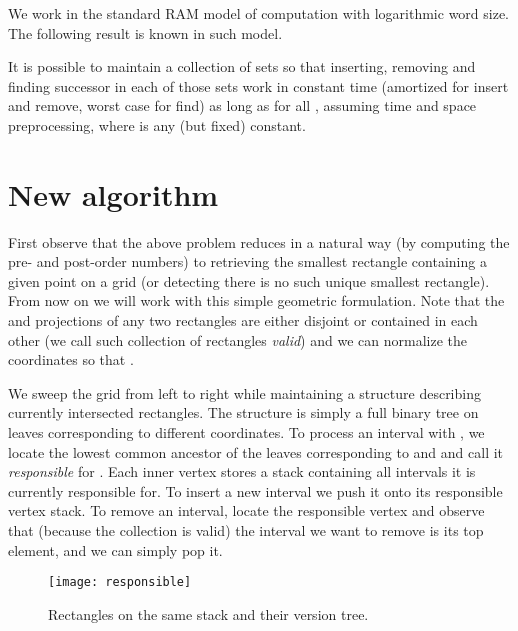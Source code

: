 \documentclass[runningheads]{llncs}
\begin{document}
We work in the standard RAM model of computation with logarithmic word size. The following result is known in such model.

\begin{lemma}\label{lemma:atomic}
It is possible to maintain a collection of sets  so that inserting, removing and finding successor in each of those sets work in constant time (amortized for insert and remove, worst case for find) as long as  for all , assuming  time and space preprocessing, where  is any (but fixed) constant.
\end{lemma} 

\section{New algorithm}
\label{section:algorithm}

First observe that the above problem reduces in a natural way (by computing the pre- and post-order numbers) to retrieving the smallest rectangle containing a given point on a  grid (or detecting there is no such unique smallest rectangle). From now on we will work with this simple geometric formulation. Note that the  and  projections of any two rectangles are either disjoint or contained in each other (we call such collection of rectangles {\it valid}) and we can normalize the coordinates so that .

We sweep the grid from left to right while maintaining a structure describing currently intersected rectangles. The structure is simply a full binary tree on  leaves corresponding to different  coordinates. To process an interval  with
, we locate the lowest common ancestor  of the leaves corresponding to  and  and call it {\it responsible} for . Each inner vertex stores a stack containing all intervals it is currently responsible for. To insert a new interval we push it onto its responsible vertex stack. To remove an interval, locate the responsible vertex and observe that (because the collection is valid) the interval we want to remove is its top element, and we can simply pop it.

\begin{figure}[t]
\centering
\texttt{[image: responsible]}
\caption{Rectangles on the same stack and their version tree.}
\label{figure:responsible}
\end{figure}
\end{document}
